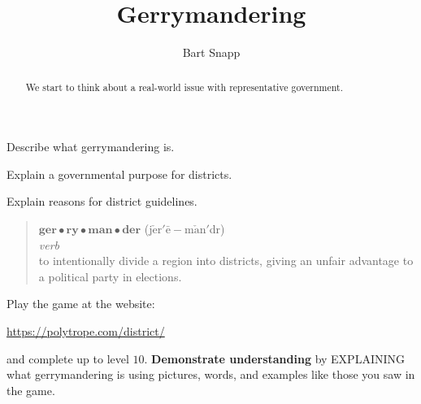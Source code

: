 \documentclass[noauthor,nooutcomes,hints,handout,12pt]{ximera}
\title{Gerrymandering}
\author{Bart Snapp}
\begin{document}
\begin{abstract}
  We start to think about a real-world issue with representative government.
\end{abstract}
\maketitle

\begin{listOutcomes}
\item Describe what gerrymandering is.
\item Explain a governmental purpose for districts.
\item Explain reasons for district guidelines.
\end{listOutcomes}
\begin{mdframed}[style=OutcomeStyle]
\begin{quote}
  $\textbf{ger}\bullet\textbf{ry}\bullet\textbf{man}\bullet\textbf{der}$ (j$\check{\text{e}}$r$'\bar{\text{e}}-$m$\check{\text{a}}$n$'$d{}r)
  \\
  
  \textit{verb}\\

  
\quad to intentionally divide a region into districts, giving an
unfair advantage to a political party in elections.
\end{quote}
\end{mdframed}




\mynewpage






\begin{question}
  Play the game  at the website:
  \begin{center}
    \url{https://polytrope.com/district/}
  \end{center}
  and complete up to level $10$.  
  \textbf{Demonstrate understanding} by EXPLAINING what gerrymandering is using pictures, words, and examples like those you saw in the game.
  
\end{question}


\mynewpage
\end{document}
